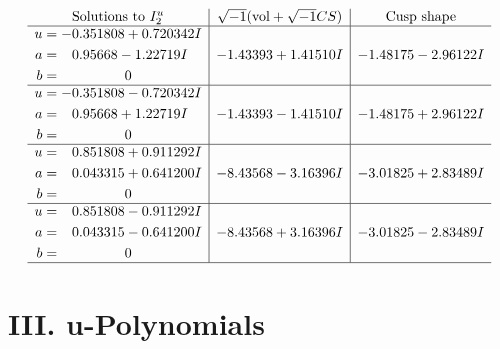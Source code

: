 \documentclass[1p]{elsarticle_modified}
\theoremstyle{definition}
\newcommand{\I}{\sqrt{-1}}
\begin{document}
$$\begin{array}{c|c|c}  
\text{Solutions to }I^u_{2}& \I (\text{vol} + \sqrt{-1}CS) & \text{Cusp shape}\\
 \hline 
\begin{aligned}
u &= -0.351808 + 0.720342 I \\
a &= \phantom{-}0.95668 - 1.22719 I \\
b &= \phantom{-0.000000 } 0\end{aligned}
 & -1.43393 + 1.41510 I & -1.48175 - 2.96122 I \\ \hline\begin{aligned}
u &= -0.351808 - 0.720342 I \\
a &= \phantom{-}0.95668 + 1.22719 I \\
b &= \phantom{-0.000000 } 0\end{aligned}
 & -1.43393 - 1.41510 I & -1.48175 + 2.96122 I \\ \hline\begin{aligned}
u &= \phantom{-}0.851808 + 0.911292 I \\
a &= \phantom{-}0.043315 + 0.641200 I \\
b &= \phantom{-0.000000 } 0\end{aligned}
 & -8.43568 - 3.16396 I & -3.01825 + 2.83489 I \\ \hline\begin{aligned}
u &= \phantom{-}0.851808 - 0.911292 I \\
a &= \phantom{-}0.043315 - 0.641200 I \\
b &= \phantom{-0.000000 } 0\end{aligned}
 & -8.43568 + 3.16396 I & -3.01825 - 2.83489 I\\
 \hline 
 \end{array}$$\newpage
\newpage\renewcommand{\arraystretch}{1}
\centering \section*{ III. u-Polynomials}
\end{document}

